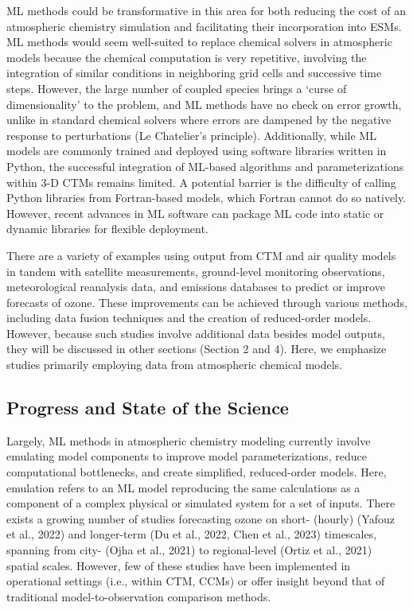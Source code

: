 \documentclass[gmd, manuscript]{copernicus}
\begin{document}
ML methods could be transformative in this area for both reducing the cost of an atmospheric chemistry simulation and facilitating their incorporation into ESMs. ML methods would seem well-suited to replace chemical solvers in atmospheric models because the chemical computation is very repetitive, involving the integration of similar conditions in neighboring grid cells and successive time steps. However, the large number of coupled species brings a ‘curse of dimensionality’ to the problem, and ML methods have no check on error growth, unlike in standard chemical solvers where errors are dampened by the negative response to perturbations (Le Chatelier’s principle). Additionally, while ML models are commonly trained and deployed using software libraries written in Python, the successful integration of ML-based algorithms and parameterizations within 3-D CTMs remains limited. A potential barrier is the difficulty of calling Python libraries from Fortran-based models, which Fortran cannot do so natively. However, recent advances in ML software can package ML code into static or dynamic libraries for flexible deployment.
                                                                             
There are a variety of examples using output from CTM and air quality models in tandem with satellite measurements, ground-level monitoring observations, meteorological reanalysis data, and emissions databases to predict or improve forecasts of ozone. These improvements can be achieved through various methods, including data fusion techniques and the creation of reduced-order models. However, because such studies involve additional data besides model outputs, they will be discussed in other sections (Section 2 and 4). Here, we emphasize studies primarily employing data from atmospheric chemical models.

\subsection{Progress and State of the Science}
Largely, ML methods in atmospheric chemistry modeling currently involve emulating model components to improve model parameterizations, reduce computational bottlenecks, and create simplified, reduced-order models. Here, emulation refers to an ML model reproducing the same calculations as a component of a complex physical or simulated system for a set of inputs. There exists a growing number of studies forecasting ozone on short- (hourly) (Yafouz et al., 2022) and longer-term (Du et al., 2022, Chen et al., 2023) timescales, spanning from city- (Ojha et al., 2021) to regional-level (Ortiz et al., 2021) spatial scales. However, few of these studies have been implemented in operational settings (i.e., within CTM, CCMs) or offer insight beyond that of traditional model-to-observation comparison methods.   
\end{document}
